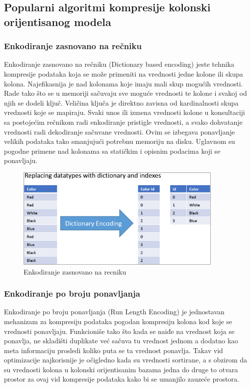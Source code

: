 \documentclass[12pt,oneside]{memoir}
\begin{document}
\subsection{Popularni algoritmi kompresije kolonski orijentisanog modela}
\cite{ColumnarOptimizations}
\subsubsection{Enkodiranje zasnovano na rečniku}

Enkodiranje zasnovano na rečniku (Dictionary based encoding) jeste tehnika kompresije podataka koja se može primeniti na vrednosti jedne kolone ili skupa kolona. Najefikasnija je nad kolonama koje imaju mali skup mogućih vrednosti. Rade tako što se u memoriji sačuvaju sve moguće vrednosti te kolone i svakoj od njih se dodeli ključ. Veličina ključa je direktno zavisna od kardinalnosti skupa vrednosti koje se mapiraju. Svaki unos ili izmena vrednosti kolone u konsultaciji sa postojećim rečnikom radi enkodiranje pristigle vrednosti, a svako dohvatanje vrednosti radi dekodiranje sačuvane vrednosti. Ovim se izbegava ponavljanje velikih podataka tako smanjujući potrebnu memoriju na disku. Uglavnom su pogodne primene nad kolonama sa statičkim i opisnim podacima koji se ponavljaju.
\begin{figure}[!ht]
  \centering
  \includegraphics[width=0.9\textwidth]{DictionaryEncoding.jpg}
  \caption{Enkodiranje zasnovano na recniku}
  \label{fig:grafikon}
\end{figure}


\subsubsection{Enkodiranje po broju ponavljanja}

Enkodiranje po broju ponavljanja (Run Length Encoding) je jednostavan mehanizam za kompresiju podataka pogodan kompresiju kolona kod koje se vrednosti ponavljaju. Funkcioniše tako što kada se naiđe na vrednost koja se ponavlja, ne skladišti duplikate već sačuva tu vrednost jednom a dodatno kao meta informaciju prosledi koliko puta se ta vrednost ponavlja. Takav vid optimizacije najkorisnije je očigledno kada su vrednosti sortirane, a s obzirom da su vrednosti kolona u kolonski orijentisanim bazama jedna do druge to otvara prostor za ovaj vid kompresije podataka kako bi se umanjilo zauzeće prostora.
\end{document}
